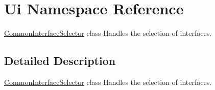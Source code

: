\hypertarget{namespace_ui}{}\section{Ui Namespace Reference}
\label{namespace_ui}


\hyperlink{class_common_interface_selector}{Common\+Interface\+Selector} class Handles the selection of interfaces.  




\subsection{Detailed Description}
\hyperlink{class_common_interface_selector}{Common\+Interface\+Selector} class Handles the selection of interfaces. 